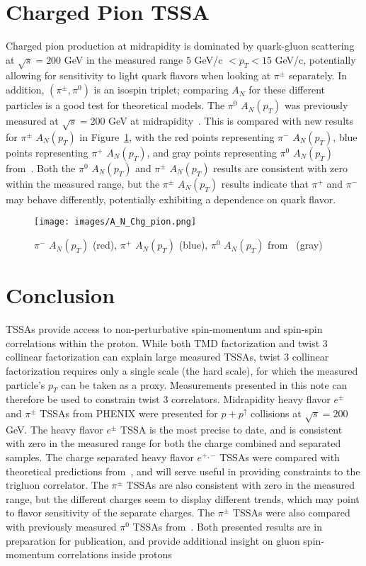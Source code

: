 \documentclass[submission, Proceedings]{SciPost}
\begin{document}
\section{Charged Pion TSSA}\label{sec:pions}
Charged pion production at midrapidity is dominated by quark-gluon scattering at $\sqrt{s} = 200$ GeV in the measured range $5$ GeV/c $ < p_{T} < 15$ GeV/c, potentially allowing for sensitivity to light quark flavors when looking at $\pi^{\pm}$ separately. In addition, $(\pi^{\pm}, \pi^{0})$ is an isospin triplet; comparing $A_{N}$ for these different particles is a good test for theoretical models. The $\pi^{0}$ $A_{N}(p_{T})$ was previously measured at $\sqrt{s} = 200$ GeV at midrapidity~\cite{pi0AN}. This is compared with new results for $\pi^{\pm}$ $A_{N}(p_{T})$ in Figure~\ref{fig:AN_chargedpions}, with the red points representing $\pi^{-}$ $A_{N}(p_{T})$, blue points representing $\pi^{+}$ $A_{N}(p_{T})$, and gray points representing $\pi^{0}$ $A_{N}(p_{T})$ from~\cite{pi0AN}. Both the $\pi^{0}$ $A_{N}(p_{T})$ and $\pi^{\pm}$ $A_{N}(p_{T})$ results are consistent with zero within the measured range, but the $\pi^{\pm}$ $A_{N}(p_{T})$ results indicate that $\pi^{+}$ and $\pi^{-}$ may behave differently, potentially exhibiting a dependence on quark flavor.  
\begin{figure}[H]
    \centering
    \texttt{[image: images/A\_N\_Chg\_pion.png]}
    \caption{$\pi^{-}$ $A_{N}(p_{T})$ (red), $\pi^{+}$ $A_{N}(p_{T})$ (blue), $\pi^{0}$ $A_{N}(p_{T})$ from~\cite{pi0AN} (gray)}
    \label{fig:AN_chargedpions}
\end{figure}

\section{Conclusion}
TSSAs provide access to non-perturbative spin-momentum and spin-spin correlations within the proton. While both TMD factorization and twist 3 collinear factorization can explain large measured TSSAs, twist 3 collinear factorization requires only a single scale (the hard scale), for which the measured particle's $p_{T}$ can be taken as a proxy. Measurements presented in this note can therefore be used to constrain twist 3 correlators. Midrapidity heavy flavor $e^{\pm}$ and $\pi^{\pm}$ TSSAs from PHENIX were presented for $p + p^{\uparrow}$ collisions at $\sqrt{s} = 200$ GeV. The heavy flavor $e^{\pm}$ TSSA is the most precise to date, and is consistent with zero in the measured range for both the charge combined and separated samples. The charge separated heavy flavor $e^{+,-}$ TSSAs were compared with theoretical predictions from~\cite{trigluon_twists}, and will serve useful in providing constraints to the trigluon correlator. The $\pi^{\pm}$ TSSAs are also consistent with zero in the measured range, but the different charges seem to display different trends, which may point to flavor sensitivity of the separate charges. The $\pi^{\pm}$ TSSAs were also compared with previously measured $\pi^{0}$ TSSAs from~\cite{pi0AN}. Both presented results are in preparation for publication, and provide additional insight on gluon spin-momentum correlations inside protons
\end{document}
